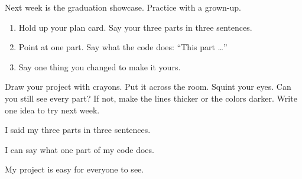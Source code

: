 
\begin{playathome}
Next week is the graduation showcase. Practice with a grown-up.
\begin{enumerate}[leftmargin=1.4em,itemsep=2pt]
  \item Hold up your plan card. Say your three parts in three sentences.
  \item Point at one part. Say what the code does: \enquote{This part \ldots}
  \item Say one thing you changed to make it yours.
\end{enumerate}
\end{playathome}

\begin{playathome}
Draw your project with crayons. Put it across the room. Squint your eyes. Can you still see every part? If not, make the lines thicker or the colors darker. Write one idea to try next week.
\end{playathome}

\begin{selfcheck}
  \item I said my three parts in three sentences.
  \item I can say what one part of my code does.
  \item My project is easy for everyone to see.
\end{selfcheck}
